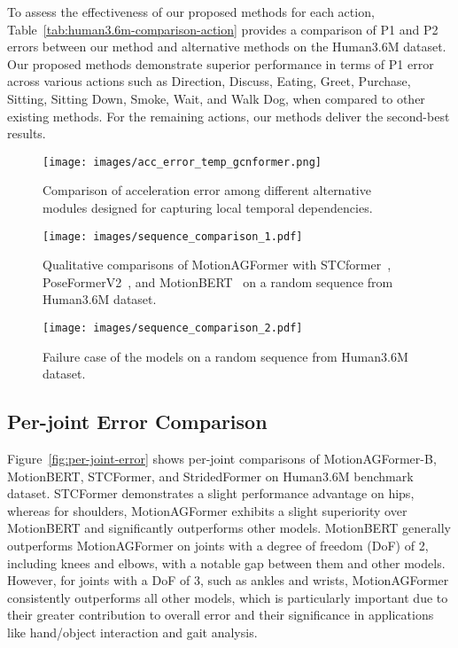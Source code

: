 \documentclass[10pt,twocolumn,letterpaper]{article}
\begin{document}
    To assess the effectiveness of our proposed methods for each action, Table~\ref{tab:human3.6m-comparison-action} provides a comparison of P1 and P2 errors between our method and alternative methods on the Human3.6M dataset. Our proposed methods demonstrate superior performance in terms of P1 error across various actions such as Direction, Discuss, Eating, Greet, Purchase, Sitting, Sitting Down, Smoke, Wait, and Walk Dog, when compared to other existing methods. For the remaining actions, our methods deliver the second-best results.
    \begin{figure}[!t]
          \centering
          \texttt{[image: images/acc\_error\_temp\_gcnformer.png]}
          \caption{Comparison of acceleration error among different alternative modules designed for capturing local temporal dependencies.}
          \label{fig:acc-error-temp-gcnformer}
    \end{figure}
    \begin{figure*}[!t]
      \centering
      \texttt{[image: images/sequence\_comparison\_1.pdf]}
      \caption{Qualitative comparisons of MotionAGFormer with STCformer~\cite{STCFormer}, PoseFormerV2~\cite{poseformerv2}, and MotionBERT~\cite{motionbert} on a random sequence from Human3.6M dataset.}
      \label{fig:sequence-comparison-1}
    \end{figure*}
    \begin{figure*}[!t]
      \centering
      \texttt{[image: images/sequence\_comparison\_2.pdf]}
      \caption{Failure case of the models on a random sequence from Human3.6M dataset.}
      \label{fig:sequence-comparison-2}
    \end{figure*}
    \subsection{Per-joint Error Comparison}
    Figure~\ref{fig:per-joint-error} shows per-joint comparisons of MotionAGFormer-B, MotionBERT, STCFormer, and StridedFormer on Human3.6M benchmark dataset. STCFormer demonstrates a slight performance advantage on hips, whereas for shoulders, MotionAGFormer exhibits a slight superiority over MotionBERT and significantly outperforms other models. MotionBERT generally outperforms MotionAGFormer on joints with a degree of freedom (DoF) of 2, including knees and elbows, with a notable gap between them and other models. However, for joints with a DoF of 3, such as ankles and wrists, MotionAGFormer consistently outperforms all other models, which is particularly important due to their greater contribution to overall error and their significance in applications like hand/object interaction and gait analysis.
\end{document}
